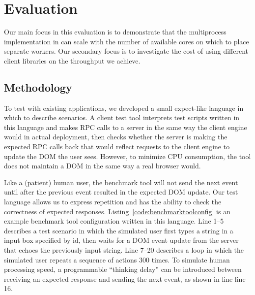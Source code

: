 \chapter{Evaluation}

Our main focus in this evaluation is to demonstrate that the multiprocess implementation
in \cbtwo can scale with the number of available cores on which to place separate workers.
Our secondary focus is to investigate the cost of using different client libraries on 
the throughput we achieve.

\section{Methodology}
To test \cbtwo with existing applications, we developed a small expect-like language 
in which to describe scenarios. A client test tool interprets test scripts written in
this language and makes RPC calls to a server in the same way the client engine would
in actual deployment, then checks whether the server is making the expected RPC
calls back that would reflect requests to the client engine to update the DOM the
user sees.  
However, to minimize CPU consumption, the tool does not maintain a DOM in the same
way a real browser would.



Like a (patient) human user, the benchmark tool will not send the next event until after the
previous event resulted in the expected DOM update.
Our test language allows us to express repetition and has the ability to check
the correctness of expected responses.
Listing~\ref{code:benchmarktoolconfig} is an example benchmark tool
configuration written in this language.
Line 1--5  describes a test scenario
in which the simulated user first types a string in a input box specified by
id, then waits for a DOM event update from the server that echoes the
previously input string. Line 7--20 describes a loop in which the simulated
user repeats a sequence of actions 300 times.
To simulate human processing speed, a programmable ``thinking delay'' can be introduced 
between receiving an expected response and sending the next event, as
shown in line line 16.

